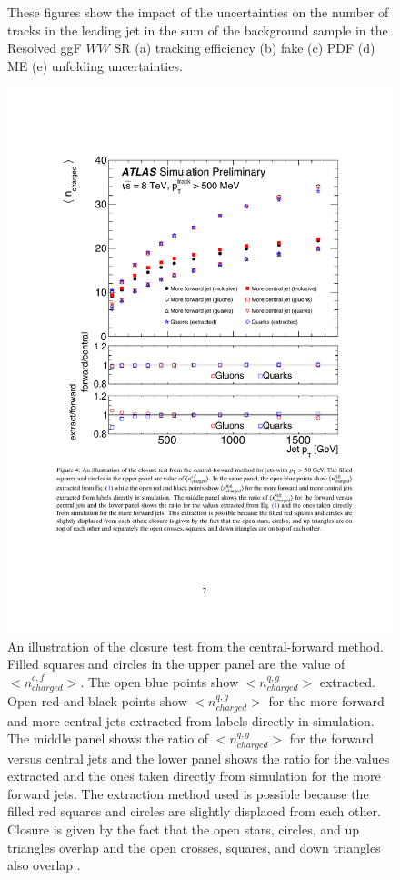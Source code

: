 {\begin{figure}[h!]
  \caption{These figures show the impact of the uncertainties on the number of tracks in the leading jet in the sum of the background sample in the Resolved ggF $WW$ SR (a) tracking efficiency (b) fake (c) PDF (d) ME (e) unfolding uncertainties.}
  \label{fig:qg_calib_ntrk_indiv}
\end{figure}
\FloatBarrier


\begin{figure}[h!]
  \centering
  \includegraphics[width=\hsize]{figures/QGT/closure_qg.pdf}
  \caption{An illustration of the closure test from the central-forward method. Filled squares and circles in the upper panel are the value of $<n_{charged}^{c,f}>$. The open blue points show $<n_{charged}^{q,g}>$ extracted. Open red and black points show $<n_{charged}^{q,g}>$ for the more forward and more central jets extracted from labels directly in simulation. The middle panel shows the ratio of $<n_{charged}^{q,g}>$ for the forward versus central jets and the lower panel shows the ratio for the values extracted and the ones taken directly from simulation for the more forward jets. The extraction method used is possible because the filled red squares and circles are slightly displaced from each other. Closure is given by the fact that the open stars, circles, and up triangles overlap and the open crosses, squares, and down triangles also overlap \cite{Unfolding}. }
  \label{fig:closure_qg}
\end{figure}
\FloatBarrier
}
